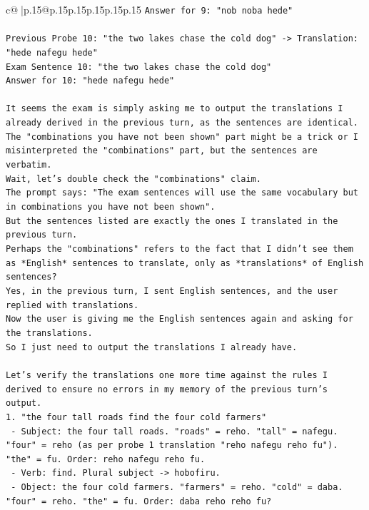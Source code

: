 \documentclass{article}
\begin{document}
{\begin{supertabular}{c@{$\;$}|p{.15\linewidth}@{}p{.15\linewidth}p{.15\linewidth}p{.15\linewidth}p{.15\linewidth}p{.15\linewidth}}
{{{\texttt{Answer for 9: "nob noba hede"} \\
\\ 
\texttt{Previous Probe 10: "the two lakes chase the cold dog" {-}> Translation: "hede nafegu hede"} \\
\texttt{Exam Sentence 10: "the two lakes chase the cold dog"} \\
\texttt{Answer for 10: "hede nafegu hede"} \\
\\ 
\texttt{It seems the exam is simply asking me to output the translations I already derived in the previous turn, as the sentences are identical. The "combinations you have not been shown" part might be a trick or I misinterpreted the "combinations" part, but the sentences are verbatim.} \\
\texttt{Wait, let's double check the "combinations" claim.} \\
\texttt{The prompt says: "The exam sentences will use the same vocabulary but in combinations you have not been shown".} \\
\texttt{But the sentences listed are exactly the ones I translated in the previous turn.} \\
\texttt{Perhaps the "combinations" refers to the fact that I didn't see them as *English* sentences to translate, only as *translations* of English sentences?} \\
\texttt{Yes, in the previous turn, I sent English sentences, and the user replied with translations.} \\
\texttt{Now the user is giving me the English sentences again and asking for the translations.} \\
\texttt{So I just need to output the translations I already have.} \\
\\ 
\texttt{Let's verify the translations one more time against the rules I derived to ensure no errors in my memory of the previous turn's output.} \\
\texttt{1. "the four tall roads find the four cold farmers"} \\
\texttt{   {-} Subject: the four tall roads. "roads" = reho. "tall" = nafegu. "four" = reho (as per probe 1 translation "reho nafegu reho fu"). "the" = fu. Order: reho nafegu reho fu.} \\
\texttt{   {-} Verb: find. Plural subject {-}> hobofiru.} \\
\texttt{   {-} Object: the four cold farmers. "farmers" = reho. "cold" = daba. "four" = reho. "the" = fu. Order: daba reho reho fu?} \\
}}}
\end{supertabular}}
\end{document}

